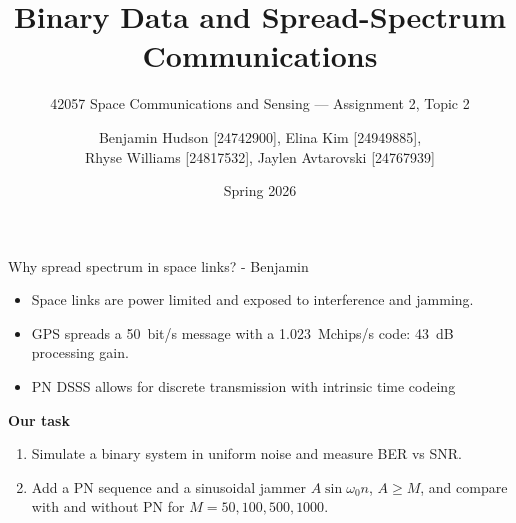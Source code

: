 \documentclass[aspectratio=169,11pt]{beamer}
\title{Binary Data and Spread-Spectrum Communications}
\subtitle{42057 Space Communications and Sensing --- Assignment 2, Topic 2}
\author{Benjamin Hudson [24742900], Elina Kim [24949885], \\ Rhyse Williams [24817532], Jaylen Avtarovski [24767939]}
\date{Spring 2026}
\begin{document}
\maketitle

\begin{frame}{Why spread spectrum in space links? - Benjamin}
\begin{itemize}
  \item Space links are power limited and exposed to interference and jamming.
  \item GPS spreads a \SI{50}{bit/s} message with a \SI{1.023}{Mchips/s} code:
        \alert{\SI{43}{dB} processing gain}.
  \item PN DSSS allows for discrete transmission with intrinsic time codeing
\end{itemize}
\vspace{0.4cm}
\textbf{Our task}
\begin{enumerate}
  \item Simulate a binary system in uniform noise and measure BER vs SNR.
  \item Add a PN sequence and a sinusoidal jammer $A\sin\omega_0 n$, $A\ge M$,
        and compare with and without PN for $M=50,100,500,1000$.
\end{enumerate}
\end{frame}
\end{document}
